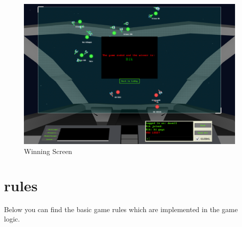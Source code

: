 \begin{figure}[!ht]
	\centering
	\includegraphics[width=.85\textwidth]{chapters/gamerules/gameend.png}
	\caption*{Winning Screen}
\end{figure}

\clearpage
\section*{rules}
Below you can find the basic game rules which are implemented in the game logic.

